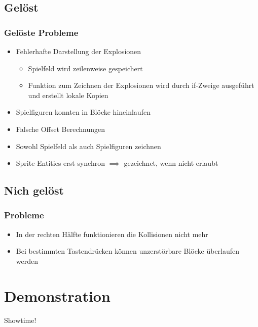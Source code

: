 \documentclass[18pt]{beamer}
\begin{document}
	\subsection{Gelöst}
	\begin{frame}
		\frametitle{Gelöste Probleme}
		\begin{itemize}
			\item Fehlerhafte Darstellung der Explosionen
			\begin{itemize}
				\item Spielfeld wird zeilenweise gespeichert
				\item Funktion zum Zeichnen der Explosionen wird durch if-Zweige ausgeführt und erstellt lokale Kopien
			\end{itemize}
			\item Spielfiguren konnten in Blöcke hineinlaufen
			\item Falsche Offset Berechnungen
			\item Sowohl Spielfeld als auch Spielfiguren zeichnen
			\item Sprite-Entities erst synchron $\implies$ gezeichnet, wenn nicht erlaubt
		\end{itemize}
	\end{frame}
	
	\subsection{Nich gelöst}
	\begin{frame}
		\frametitle{Probleme}
		\begin{itemize}
			\item In der rechten Hälfte funktionieren die Kollisionen nicht mehr
			\item Bei bestimmten Tastendrücken können unzerstörbare Blöcke überlaufen werden
		\end{itemize}
\end{frame}

\section{Demonstration}
	\begin{frame}
		\centering \huge	Showtime!
\end{frame}
		
\end{document}
